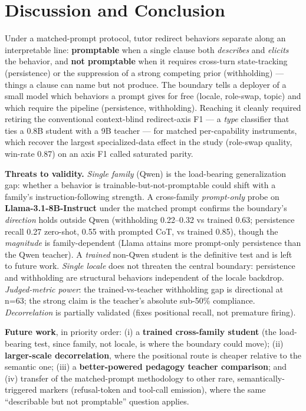 \section{Discussion and Conclusion}\label{discussion-and-conclusion}

Under a matched-prompt protocol, tutor redirect behaviors separate along
an interpretable line: \textbf{promptable} when a single clause both
\emph{describes} and \emph{elicits} the behavior, and \textbf{not
promptable} when it requires cross-turn state-tracking (persistence) or
the suppression of a strong competing prior (withholding) --- things a
clause can name but not produce. The boundary tells a deployer of a
small model which behaviors a prompt gives for free (locale, role-swap,
topic) and which require the pipeline (persistence, withholding).
Reaching it cleanly required retiring the conventional context-blind
redirect-axis F1 --- a \emph{type} classifier that ties a 0.8B student
with a 9B teacher --- for matched per-capability instruments, which
recover the largest specialized-data effect in the study (role-swap
quality, win-rate 0.87) on an axis F1 called saturated parity.

\textbf{Threats to validity.} \emph{Single family} (Qwen) is the
load-bearing generalization gap: whether a behavior is
trainable-but-not-promptable could shift with a family's
instruction-following strength. A cross-family \emph{prompt-only} probe
on \textbf{Llama-3.1-8B-Instruct} under the matched prompt confirms the
boundary's \emph{direction} holds outside Qwen (withholding 0.22--0.32
vs trained 0.63; persistence recall 0.27 zero-shot, 0.55 with prompted
CoT, vs trained 0.85), though the \emph{magnitude} is family-dependent
(Llama attains more prompt-only persistence than the Qwen teacher). A
\emph{trained} non-Qwen student is the definitive test and is left to
future work. \emph{Single locale} does not threaten the central
boundary: persistence and withholding are structural behaviors
independent of the locale backdrop. \emph{Judged-metric power}: the
trained-vs-teacher withholding gap is directional at n=63; the strong
claim is the teacher's absolute sub-50\% compliance.
\emph{Decorrelation} is partially validated (fixes positional recall,
not premature firing).

\textbf{Future work}, in priority order: (i) a \textbf{trained
cross-family student} (the load-bearing test, since family, not locale,
is where the boundary could move); (ii) \textbf{larger-scale
decorrelation}, where the positional route is cheaper relative to the
semantic one; (iii) a \textbf{better-powered pedagogy teacher
comparison}; and (iv) transfer of the matched-prompt methodology to
other rare, semantically-triggered markers (refusal-token and tool-call
emission), where the same ``describable but not promptable'' question
applies.

